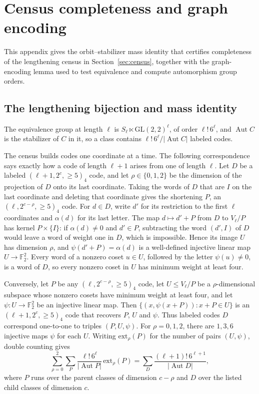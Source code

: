 \documentclass[11pt]{article}
\theoremstyle{definition}
\theoremstyle{remark}
\newcommand{\F}{\mathbb F_2}
\newcommand{\Aut}{\operatorname{Aut}}
\begin{document}
\section{Census completeness and graph encoding}\label{app:census}

This appendix gives the orbit--stabilizer mass identity that certifies
completeness of the lengthening census in Section~\ref{sec:census},
together with the graph-encoding lemma used to test equivalence and
compute automorphism group orders.

\subsection{The lengthening bijection and mass identity}

The equivalence group at length \(\ell\) is
\(S_\ell\ltimes\mathrm{GL}(2,2)^\ell\), of order \(\ell!\,6^\ell\), and
\(\Aut C\) is the stabilizer of \(C\) in it, so a class contains
\(\ell!\,6^\ell/|\Aut C|\) labeled codes.

The census builds codes one coordinate at a time. The following
correspondence says exactly how a code of length \(\ell+1\) arises from
one of length \(\ell\). Let \(D\) be a labeled \((\ell+1,2^c,{\geq}5)_4\)
code, and let \(\rho\in\{0,1,2\}\) be the dimension of the projection of
\(D\) onto its last coordinate. Taking the words of \(D\) that are \(I\)
on the last coordinate and deleting that coordinate gives the shortening
\(P\), an \((\ell,2^{c-\rho},{\geq}5)_4\) code. For \(d\in D\), write
\(d'\) for its restriction to the first \(\ell\) coordinates and
\(\alpha(d)\) for its last letter. The map \(d\mapsto d'+P\) from \(D\)
to \(V_\ell/P\) has kernel \(P\times\{I\}\): if \(\alpha(d)\neq0\) and
\(d'\in P\), subtracting the word \((d',I)\) of \(D\) would leave a word
of weight one in \(D\), which is impossible. Hence its image \(U\) has
dimension \(\rho\), and \(\psi(d'+P)=\alpha(d)\) is a well-defined
injective linear map \(U\to\F^2\). Every word of a nonzero coset
\(u\in U\), followed by the letter \(\psi(u)\neq0\), is a word of \(D\),
so every nonzero coset in \(U\) has minimum weight at least four.

Conversely, let \(P\) be any \((\ell,2^{c-\rho},{\geq}5)_4\) code, let
\(U\leq V_\ell/P\) be a \(\rho\)-dimensional subspace whose nonzero
cosets have minimum weight at least four, and let \(\psi:U\to\F^2\) be
an injective linear map. Then \(\{(x,\psi(x+P)):x+P\in U\}\) is an
\((\ell+1,2^c,{\geq}5)_4\) code that recovers \(P\), \(U\) and \(\psi\).
Thus labeled codes \(D\) correspond one-to-one to triples
\((P,U,\psi)\). For \(\rho=0,1,2\), there are \(1,3,6\) injective maps
\(\psi\) for each \(U\). Writing \(\mathrm{ext}_\rho(P)\) for the number
of pairs \((U,\psi)\), double counting gives
\begin{equation}\label{eq:mass}
 \sum_{\rho=0}^{2}\sum_{P}\frac{\ell!\,6^\ell}{|\Aut P|}\,
 \mathrm{ext}_\rho(P)
 =\sum_{D}\frac{(\ell+1)!\,6^{\ell+1}}{|\Aut D|},
\end{equation}
where \(P\) runs over the parent classes of dimension \(c-\rho\) and
\(D\) over the listed child classes of dimension \(c\).
\end{document}
